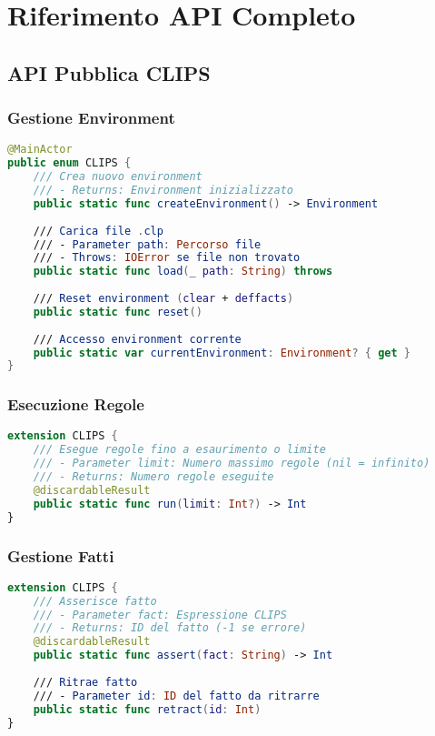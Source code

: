 
\chapter{Riferimento API Completo}
\label{app:api}

\section{API Pubblica CLIPS}

\subsection{Gestione Environment}

\begin{lstlisting}[language=Swift]
@MainActor
public enum CLIPS {
    /// Crea nuovo environment
    /// - Returns: Environment inizializzato
    public static func createEnvironment() -> Environment
    
    /// Carica file .clp
    /// - Parameter path: Percorso file
    /// - Throws: IOError se file non trovato
    public static func load(_ path: String) throws
    
    /// Reset environment (clear + deffacts)
    public static func reset()
    
    /// Accesso environment corrente
    public static var currentEnvironment: Environment? { get }
}
\end{lstlisting}

\subsection{Esecuzione Regole}

\begin{lstlisting}[language=Swift]
extension CLIPS {
    /// Esegue regole fino a esaurimento o limite
    /// - Parameter limit: Numero massimo regole (nil = infinito)
    /// - Returns: Numero regole eseguite
    @discardableResult
    public static func run(limit: Int?) -> Int
}
\end{lstlisting}

\subsection{Gestione Fatti}

\begin{lstlisting}[language=Swift]
extension CLIPS {
    /// Asserisce fatto
    /// - Parameter fact: Espressione CLIPS
    /// - Returns: ID del fatto (-1 se errore)
    @discardableResult
    public static func assert(fact: String) -> Int
    
    /// Ritrae fatto
    /// - Parameter id: ID del fatto da ritrarre
    public static func retract(id: Int)
}
\end{lstlisting}

